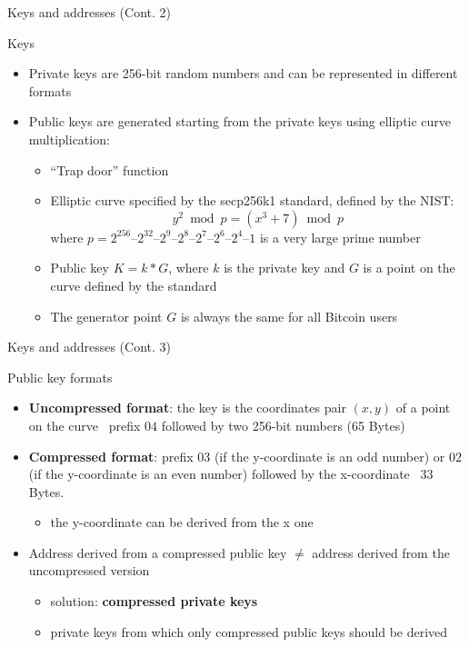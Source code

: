 \documentclass{beamer}
\begin{document}
  \begin{frame}{Keys and addresses (Cont. 2)}
    \begin{block}{Keys}
      \begin{itemize}
        \item Private keys are 256-bit random numbers and can be represented
        in different formats \pause
        \item Public keys are generated starting from the private keys using
        elliptic curve multiplication: \pause
        \begin{itemize}
          \item ``Trap door'' function \pause
          \item Elliptic curve  specified by the secp256k1 standard, defined by the NIST:
          \[ y^2 \bmod p = (x^3 + 7) \bmod p \]
          where $p = 2^{256} – 2^{32} – 2^9 – 2^8 – 2^7 – 2^6 – 2^4 – 1$ is a very large prime number \pause
          \item Public key $K=k*G$, where $k$ is the private key and $G$ is
          a point on the curve defined by the standard \pause
          \item The generator point $G$ is always the same for all Bitcoin users
        \end{itemize}
      \end{itemize}
    \end{block}
  \end{frame}





  \begin{frame}{Keys and addresses (Cont. 3)}
    \begin{block}{Public key formats}
      \begin{itemize}
        \item \textbf{Uncompressed format}: the key is the coordinates pair
        $(x,y)$ of a point on the curve \MVRightarrow\, prefix $04$ followed by
        two 256-bit numbers (65 Bytes) \pause
        \item \textbf{Compressed format}: prefix $03$ (if the y-coordinate is an
        odd number) or $02$ (if the y-coordinate is an even number) followed
        by the x-coordinate \MVRightarrow\ 33 Bytes. \pause
        \begin{itemize}
          \item the y-coordinate can be derived from the x one \pause
        \end{itemize}
        \item Address derived from a compressed public key $\neq$ address derived
        from the uncompressed version \pause
        \begin{itemize}
          \item solution: \textbf{compressed private keys} \pause
          \item private keys from which only compressed
          public keys should be derived
        \end{itemize}
      \end{itemize}
    \end{block}
  \end{frame}
\end{document}
